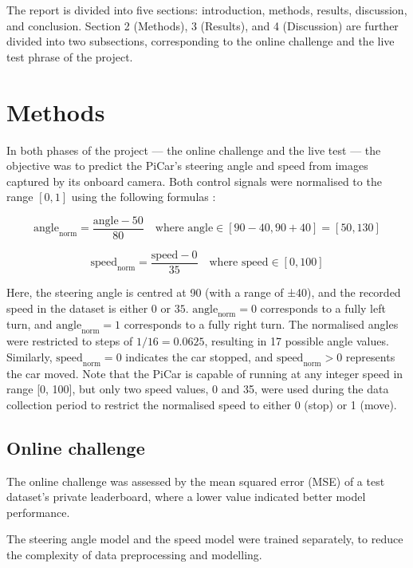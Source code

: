\documentclass{article}
\begin{document}
The report is divided into five sections: introduction, methods, results, discussion, and conclusion. Section 2 (Methods), 3 (Results), and 4 (Discussion) are further divided into two subsections, corresponding to the online challenge and the live test phrase of the project.


\section{Methods}
In both phases of the project — the online challenge and the live test — the objective was to predict the PiCar's steering angle and speed from images captured by its onboard camera. Both control signals were normalised to the range \([0, 1]\) using the following formulas \citep{Kaggle}:

\[
  \text{angle}_{\text{norm}} = \frac{\text{angle} - 50}{80}
  \quad \text{where } \text{angle} \in [90 - 40, 90 + 40] = [50, 130]
\]

\[
  \text{speed}_{\text{norm}} = \frac{\text{speed} - 0}{35}
  \quad \text{where } \text{speed} \in [0, 100]
\]

Here, the steering angle is centred at 90 (with a range of ±40), and the recorded speed in the dataset is either \(0 \text{ or } 35\). \(\text{angle}_{\text{norm}} = 0\) corresponds to a fully left turn, and \(\text{angle}_{\text{norm}} = 1\) corresponds to a fully right turn. The normalised angles were restricted to steps of \(1/16 = 0.0625\), resulting in 17 possible angle values. Similarly, \(\text{speed}_{\text{norm}} = 0\) indicates the car stopped, and \(\text{speed}_{\text{norm}} > 0\) represents the car moved. Note that the PiCar is capable of running at any integer speed in range [0, 100], but only two speed values, 0 and 35, were used during the data collection period to restrict the normalised speed to either 0 (stop) or 1 (move).



\subsection{Online challenge}

The online challenge was assessed by the mean squared error (MSE) of a test dataset's private leaderboard, where a lower value indicated better model performance.

The steering angle model and the speed model were trained separately, to reduce the complexity of data preprocessing and modelling.
\end{document}
